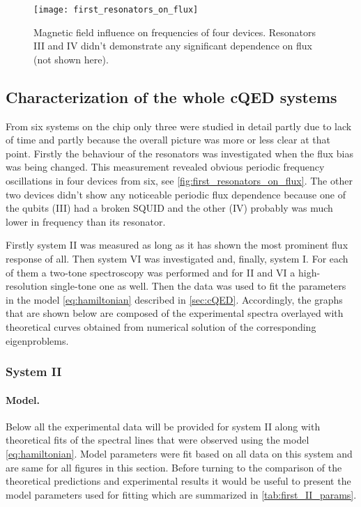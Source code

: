 \documentclass[12pt, twoside]{report}
\numberwithin{equation}{section}
\begin{document}
\begin{figure}
\centering
\texttt{[image: first\_resonators\_on\_flux]}
\caption{Magnetic field influence on frequencies of four devices. Resonators III and IV didn't demonstrate any significant dependence on flux (not shown here).}
\label{fig:first_resonators_on_flux}
\end{figure} 

\subsection{Characterization of the whole cQED systems}

From six systems on the chip only three were studied in detail partly due to lack of time and partly because the overall picture was more or less clear at that point. Firstly the behaviour of the resonators was investigated when the flux bias was being changed. This measurement revealed obvious periodic frequency oscillations in four devices from six, see \autoref{fig:first_resonators_on_flux}. The other two devices didn't show any noticeable periodic flux dependence because one of the qubits (III) had a broken SQUID and the other (IV) probably was much lower in frequency than its resonator.

Firstly system II was measured as long as it has shown the most prominent flux response of all. Then system VI was investigated and, finally, system I. For each of them a two-tone spectroscopy was performed and for II and VI a high-resolution single-tone one as well. Then the data was used to fit the parameters in the model \eqref{eq:hamiltonian} described in \autoref{sec:cQED}. Accordingly, the graphs that are shown below are composed of the experimental spectra overlayed with theoretical curves obtained from numerical solution of the corresponding eigenproblems.

\subsubsection{System II}

\paragraph{Model.} Below all the experimental data will be provided for system II along with theoretical fits of the spectral lines that were observed using the model \eqref{eq:hamiltonian}. Model parameters were fit based on all data on this system and are same for all figures in this section. Before turning to the comparison of the theoretical predictions and experimental results it would be useful to present the model parameters used for fitting which are summarized in \autoref{tab:first_II_params}.
\end{document}
